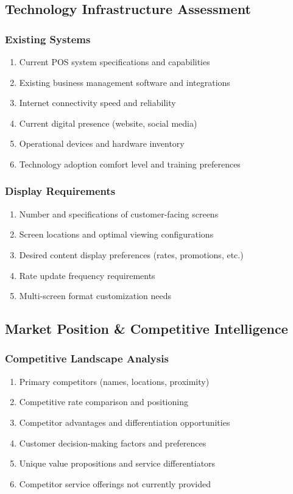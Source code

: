 \documentclass[11pt, letterpaper]{article}
\begin{document}
\subsection{Technology Infrastructure Assessment}

\subsubsection{Existing Systems}
\begin{enumerate}[leftmargin=*]
    \item Current POS system specifications and capabilities
    \item Existing business management software and integrations
    \item Internet connectivity speed and reliability
    \item Current digital presence (website, social media)
    \item Operational devices and hardware inventory
    \item Technology adoption comfort level and training preferences
\end{enumerate}

\subsubsection{Display Requirements}
\begin{enumerate}[leftmargin=*]
    \item Number and specifications of customer-facing screens
    \item Screen locations and optimal viewing configurations
    \item Desired content display preferences (rates, promotions, etc.)
    \item Rate update frequency requirements
    \item Multi-screen format customization needs
\end{enumerate}

\subsection{Market Position \& Competitive Intelligence}

\subsubsection{Competitive Landscape Analysis}
\begin{enumerate}[leftmargin=*]
    \item Primary competitors (names, locations, proximity)
    \item Competitive rate comparison and positioning
    \item Competitor advantages and differentiation opportunities
    \item Customer decision-making factors and preferences
    \item Unique value propositions and service differentiators
    \item Competitor service offerings not currently provided
\end{enumerate}
\end{document}
